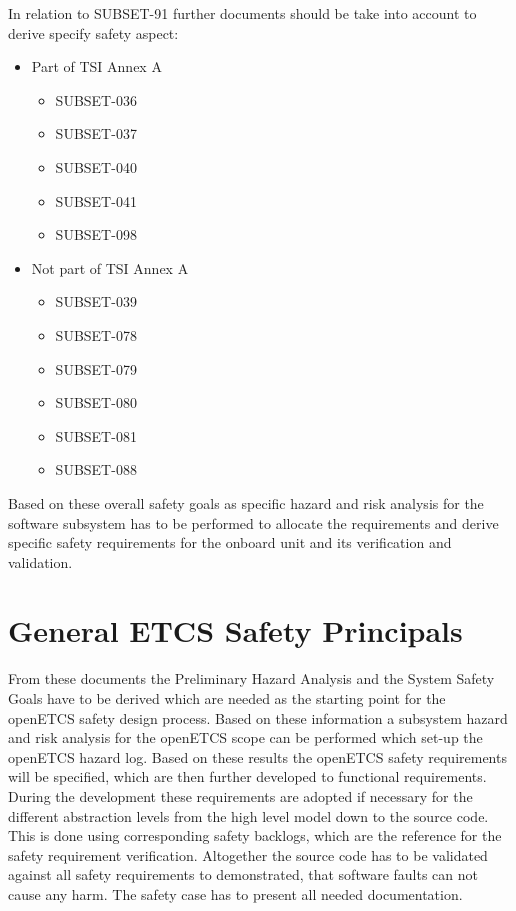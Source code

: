 \documentclass{template/openetcs_report}
\begin{document}
In relation to SUBSET-91 further documents should be take into account to derive specify safety aspect:

\begin{itemize}
\item Part of TSI Annex A
	\begin{itemize}
	\item SUBSET-036
	\item SUBSET-037
	\item SUBSET-040
	\item SUBSET-041
	\item SUBSET-098
	\end{itemize}
	
\item Not part of TSI Annex A
	\begin{itemize}
	\item SUBSET-039
	\item SUBSET-078
	\item SUBSET-079
	\item SUBSET-080
	\item SUBSET-081
	\item SUBSET-088
	\end{itemize}
\end{itemize}

Based on these overall safety goals as specific hazard and risk analysis for the software subsystem has to be performed to allocate the requirements and derive specific safety requirements for the onboard unit and its verification and validation.

\section{General ETCS Safety Principals}







From these documents the Preliminary Hazard Analysis and the System Safety Goals have to be derived which are needed as the starting point for the openETCS safety design process. Based on these information a subsystem hazard and risk analysis for the openETCS scope can be performed which set-up the openETCS hazard log. Based on these results the openETCS safety requirements will be specified, which are then further developed to functional requirements. During the development these requirements are adopted if necessary for the different abstraction levels from the high level model down to the source code. This is done using corresponding safety backlogs, which are the reference for the safety requirement verification. Altogether the source code has to be validated against all safety requirements to demonstrated, that software faults can not cause any harm. The safety case has to present all needed documentation.
 
\end{document}
